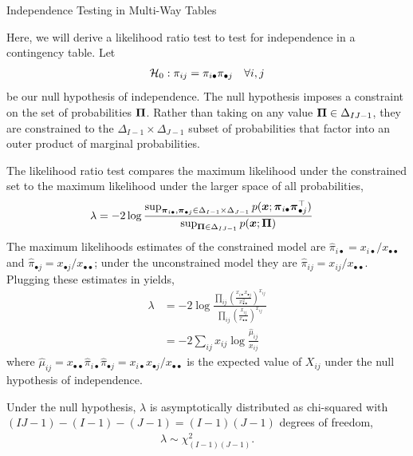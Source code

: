 \documentclass[aspectratio=169]{beamer}
\begin{document}
  \begin{frame}[t,allowframebreaks]{Independence Testing in Multi-Way
  Tables}\label{independence-testing-in-multi-way-tables}
  
  Here, we will derive a likelihood ratio test to test for independence in
  a contingency table. Let
  \begin{align*}
      \mathcal{H}_0: \pi_{ij} = \pi_{i \bullet} \pi_{\bullet j} \quad \forall i,j
  \end{align*} 
  be our null hypothesis of independence. The null hypothesis imposes a
  constraint on the set of probabilities \(\boldsymbol{\Pi}\). Rather than taking on
  any value \(\boldsymbol{\Pi} \in \Delta_{IJ - 1}\), they are constrained to the
  \(\Delta_{I-1} \times \Delta_{J-1}\) subset of probabilities that factor
  into an outer product of marginal probabilities.
  
  The likelihood ratio test compares the maximum likelihood under the
  constrained set to the maximum likelihood under the larger space of all
  probabilities, \begin{align*}
  \lambda &= 
  -2 \log \frac
  {
      \sup_{\boldsymbol{\pi}_{i \bullet}, \boldsymbol{\pi}_{\bullet j} \in \Delta_{I-1} \times \Delta_{J-1}} p(\boldsymbol{x}; \boldsymbol{\pi}_{i \bullet} \boldsymbol{\pi}_{\bullet j}^\top)
  }
  {
      \sup_{\boldsymbol{\Pi} \in \Delta_{IJ-1}} p(\boldsymbol{x}; \boldsymbol{\Pi})
  }
  \end{align*} The maximum likelihoods estimates of the constrained model
  are \(\hat{\pi}_{i \bullet} = x_{i \bullet} / x_{\bullet \bullet}\) and
  \(\hat{\pi}_{\bullet j} = x_{\bullet j} / x_{\bullet \bullet}\); under
  the unconstrained model they are
  \(\hat{\pi}_{ij} = x_{ij} / x_{\bullet \bullet}\). Plugging these
  estimates in yields, \begin{align*}
  \lambda &= 
  -2 \log \frac
  {
      \prod_{ij} \left( \frac{x_{i \bullet} x_{\bullet j}}{x_{\bullet \bullet}^2} \right)^{x_{ij}}
  }
  {
      \prod_{ij} \left( \frac{x_{i j}}{x_{\bullet \bullet}} \right)^{x_{ij}}
  } \\
  &= -2 \sum_{ij} x_{ij} \log \frac{\hat{\mu}_{ij}}{x_{ij}}
  \end{align*} where
  \(\hat{\mu}_{ij} = x_{\bullet \bullet} \hat{\pi}_{i \bullet} \hat{\pi}_{\bullet j} = x_{i \bullet} x_{\bullet j} / x_{\bullet \bullet}\)
  is the expected value of \(X_{ij}\) under the null hypothesis of
  independence.
  
  Under the null hypothesis, \(\lambda\) is asymptotically distributed as
  chi-squared with \((IJ -1) - (I-1) - (J-1) = (I-1)(J-1)\) degrees of
  freedom, \begin{align*}
  \lambda \sim \chi^2_{(I-1)(J-1)}.
  \end{align*}
  \end{frame}
  
\end{document}
